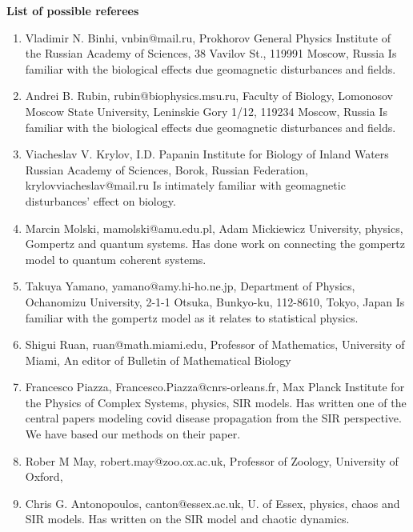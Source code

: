 \documentclass[11pt,a4paper,roman]{moderncv}
\begin{document}
\textbf{List of possible referees}
\begin{enumerate}

\item Vladimir N. Binhi, vnbin@mail.ru, Prokhorov General Physics Institute of the Russian Academy of Sciences, 38 Vavilov St., 119991 Moscow, Russia
Is familiar with the biological effects due geomagnetic disturbances and fields.
\item Andrei B. Rubin, rubin@biophysics.msu.ru, Faculty of Biology, Lomonosov Moscow State University, Leninskie Gory 1/12, 119234 Moscow, Russia
Is familiar with the biological effects due geomagnetic disturbances and fields.
\item Viacheslav V. Krylov, I.D. Papanin Institute for Biology of Inland Waters Russian Academy of Sciences, Borok, Russian Federation, krylovviacheslav@mail.ru
Is intimately familiar with geomagnetic disturbances' effect on biology.
\item Marcin Molski, mamolski@amu.edu.pl, Adam Mickiewicz University, physics, Gompertz and quantum systems. Has done work on connecting the gompertz model to quantum coherent systems.
\item Takuya Yamano, yamano@amy.hi-ho.ne.jp, Department of Physics, Ochanomizu University, 2-1-1 Otsuka, Bunkyo-ku, 112-8610, Tokyo, Japan
Is familiar with the gompertz model as it relates to statistical physics.
\item Shigui Ruan, ruan@math.miami.edu, Professor of Mathematics, University of Miami, 
An editor of Bulletin of Mathematical Biology
\item Francesco Piazza, Francesco.Piazza@cnrs-orleans.fr, Max Planck Institute for the Physics of Complex Systems, physics, SIR models.
Has written one of the central papers modeling covid disease propagation from the SIR perspective. We have based our methods on their paper.
\item Rober M May, robert.may@zoo.ox.ac.uk, Professor of Zoology, University of Oxford, 
\item Chris G. Antonopoulos, canton@essex.ac.uk, U. of Essex, physics, chaos and SIR models.
Has written on the SIR model and chaotic dynamics.



\end{enumerate} 
\end{document}
